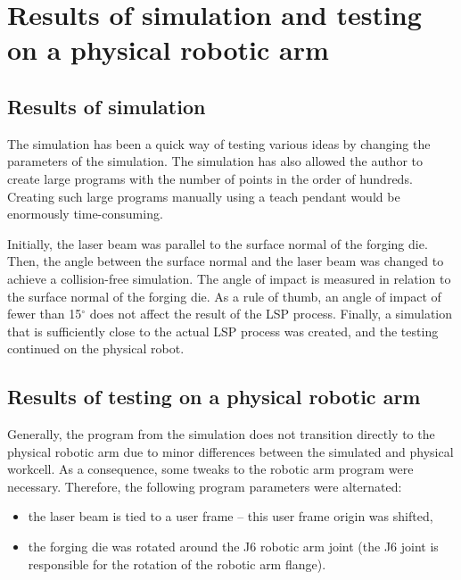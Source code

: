 \section{Results of simulation and testing on a physical robotic arm}

\subsection{Results of simulation}

The simulation has been a quick way of testing various ideas by changing the parameters of the simulation. The simulation has also allowed the author to create large programs with the number of points in the order of hundreds. Creating such large programs manually using a teach pendant would be enormously time-consuming. 

Initially, the laser beam was parallel to the surface normal of the forging die. Then, the angle between the surface normal and the laser beam was changed to achieve a collision-free simulation. The angle of impact is measured in relation to the surface normal of the forging die. As a rule of thumb, an angle of impact of fewer than 15$^{\circ}$ does not affect the result of the LSP process.  Finally, a simulation that is sufficiently close to the actual LSP process was created, and the testing continued on the physical robot.

\subsection{Results of testing on a physical robotic arm}

Generally, the program from the simulation does not transition directly to the physical robotic arm due to minor differences between the simulated and physical workcell.  As a consequence, some tweaks to the robotic arm program were necessary. Therefore, the following program parameters were alternated:

\begin{itemize}

\item the laser beam is tied to a user frame -- this user frame origin was shifted,

\item the forging die was rotated around the J6 robotic arm joint (the J6 joint is responsible for the rotation of the robotic arm flange).
 
\end{itemize}

